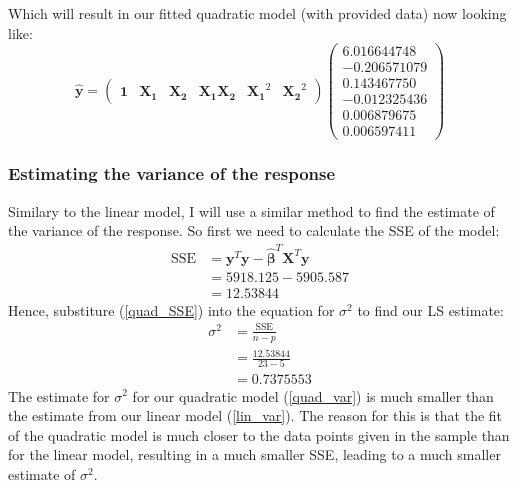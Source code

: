 \documentclass[12pt]{article}
\newcommand{\vect}[1]{\boldsymbol{#1}}
\newcommand{\trans}[1]{#1^T}
\newcommand{\est}[1]{\hat{#1}}
\begin{document}
Which will result in our fitted quadratic model (with provided data) now looking like:
\begin{equation*}
  \est{\vect{y}} = \begin{pmatrix}
                      \vect{1} & \vect{X_1} & \vect{X_2} & \vect{X_1}\vect{X_2} & \vect{X_1}^2 & \vect{X_2}^2
                   \end{pmatrix}
                   \begin{pmatrix}
                     6.016644748 \\
                    -0.206571079 \\
                     0.143467750 \\
                    -0.012325436 \\
                     0.006879675 \\
                     0.006597411
                   \end{pmatrix}
\end{equation*}


\subsubsection{Estimating the variance of the response}
Similary to the linear model, I will use a similar method to find the estimate of the variance of the response. So first we need to calculate the SSE of the model:
\begin{align} \label{quad_SSE}
  \text{SSE} & = \trans{\vect{y}}\vect{y} - \trans{\est{\vect{\beta}}}\trans{\vect{X}}\vect{y} \nonumber \\
             & = 5918.125 - 5905.587\nonumber \\
             & = 12.53844
\end{align}
Hence, substiture (\ref{quad_SSE}) into the equation for $\sigma^2$ to find our LS estimate:
\begin{align}
  \sigma^2 & = \frac{\text{SSE}} {n-p} \nonumber \\
           & = \frac{12.53844} {23-5}  \nonumber \\
           & = 0.7375553 \label{quad_var}
\end{align}
The estimate for $\sigma^2$ for our quadratic model (\ref{quad_var}) is much smaller than the estimate from our linear model (\ref{lin_var}). The reason for this is that the fit of the quadratic model is much closer to the data points given in the sample than for the linear model, resulting in a much smaller SSE, leading to a much smaller estimate of $\sigma^2$.
\end{document}

